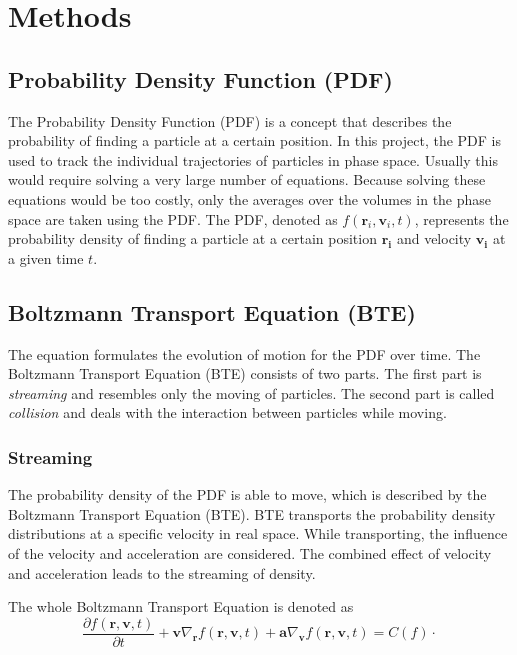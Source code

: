\chapter{Methods}\label{ch:methods}


\section{Probability Density Function (PDF)}
The Probability Density Function (PDF) is a concept that describes the probability of finding a particle at a certain position.
In this project, the PDF is used to track the individual trajectories of particles in phase space.
Usually this would require solving a very large number of equations.
Because solving these equations would be too costly, only the averages over the volumes in the phase space are taken using the PDF\@.
The PDF, denoted as \(f(\mathbf r_i,\mathbf v_i,t)\), represents the probability density of finding a particle at a certain position \(\mathbf{r_i}\) and velocity \(\mathbf{v_i}\) at a given time \(t\).


\section{Boltzmann Transport Equation (BTE)}
The equation formulates the evolution of motion for the PDF over time.
The Boltzmann Transport Equation (BTE) consists of two parts.
The first part is \textit{streaming} and resembles only the moving of particles.
The second part is called \textit{collision} and deals with the interaction between particles while moving.

\subsection{Streaming}\label{subsec:streaming}
The probability density of the PDF is able to move, which is described by the Boltzmann Transport Equation (BTE).
BTE transports the probability density distributions at a specific velocity in real space.
While transporting, the influence of the velocity and acceleration are considered.
The combined effect of velocity and acceleration leads to the streaming of density.
\newline

The whole Boltzmann Transport Equation is denoted as
\begin{equation}
    \frac{\partial f\left(\mathbf{r},\mathbf{v},t\right)}{\partial t}+\mathbf{v}\nabla_{\mathbf{r}} f\left(\mathbf{r},\mathbf{v},t\right)
    +\mathbf{a}\nabla_{\mathbf{v}} f\left(\mathbf{r},\mathbf{v},t\right)=C(f)
    \cdot
    \label{eq:bte}
\end{equation}

